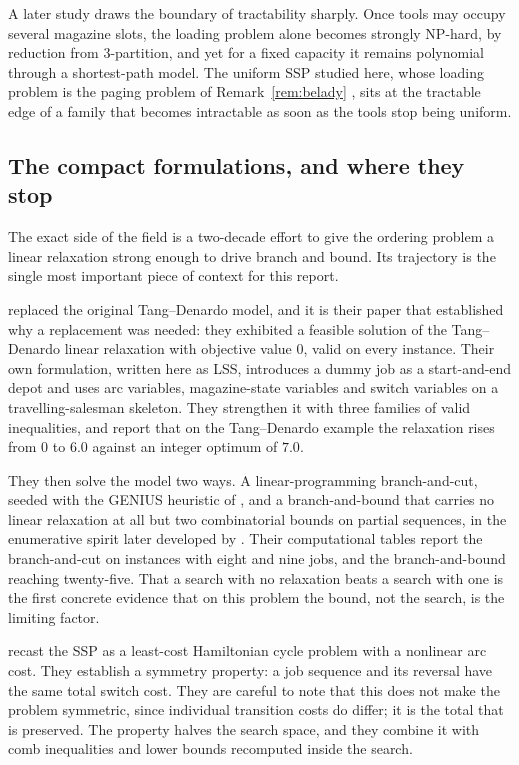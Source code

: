 A later study \citep{Crama2007} draws the boundary of tractability sharply. Once
tools may occupy several magazine slots, the loading problem alone becomes strongly
NP-hard, by reduction from $3$-partition, and yet for a fixed capacity it remains
polynomial through a shortest-path model. The uniform SSP studied here, whose loading
problem is the paging problem of Remark~\ref{rem:belady} \citep{Belady1966}, sits at
the tractable edge of a family that becomes intractable as soon as the tools stop
being uniform.

\subsection{The compact formulations, and where they stop}\label{ssec:sota-compact}

The exact side of the field is a two-decade effort to give the ordering problem a
linear relaxation strong enough to drive branch and bound. Its trajectory is the
single most important piece of context for this report.

\citet{Laporte2004} replaced the original Tang--Denardo model, and it is their paper
that established why a replacement was needed: they exhibited a feasible solution of
the Tang--Denardo linear relaxation with objective value $0$, valid on every
instance. Their own formulation, written here as LSS, introduces a dummy job as a
start-and-end depot and uses arc variables, magazine-state variables and switch
variables on a travelling-salesman skeleton. They strengthen it with three families
of valid inequalities, and report that on the Tang--Denardo example the relaxation
rises from $0$ to $6.0$ against an integer optimum of $7.0$.

They then solve the model two ways. A linear-programming branch-and-cut, seeded with
the GENIUS heuristic of \citet{Hertz1998}, and a branch-and-bound that carries no
linear relaxation at all but two combinatorial bounds on partial sequences, in the
enumerative spirit later developed by \citet{Yanasse2009}. Their computational tables
report the branch-and-cut on instances with eight and nine jobs, and the branch-and-bound
reaching twenty-five. That a search with no relaxation beats a search with one is the
first concrete evidence that on this problem the bound, not the search, is the
limiting factor.

\citet{Ghiani2010} recast the SSP as a least-cost Hamiltonian cycle problem with a
nonlinear arc cost. They establish a symmetry property: a job sequence and its
reversal have the same total switch cost. They are careful to note that this does not
make the problem symmetric, since individual transition costs do differ; it is the
total that is preserved. The property halves the search space, and they combine it
with comb inequalities and lower bounds recomputed inside the search.

